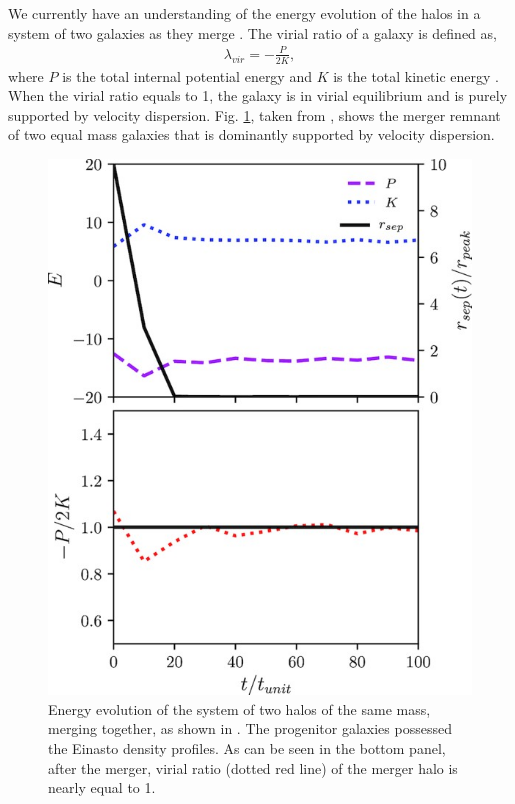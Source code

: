 \documentclass[twocolumn]{aastex631}
\begin{document}
We currently have an understanding of the energy evolution of the halos in a system of two galaxies as they merge \citep[e.g.][]{same_mass_merger_1, same_mass_merger_2}. The virial ratio of a galaxy is defined as, 
\begin{align}
    \lambda_{vir} = - \frac{P}{2K},
    \label{eq:virial_ratio}
\end{align}
where $P$ is the total internal potential energy and $K$ is the total kinetic energy \citep{same_mass_merger_1}. When the virial ratio equals to 1, the galaxy is in virial equilibrium and is purely supported by velocity dispersion. Fig. \ref{fig:virial}, taken from \cite{same_mass_merger_1}, shows the merger remnant of two equal mass galaxies that is dominantly supported by velocity dispersion.

\begin{figure}[htbp]
\includegraphics[width=.5\textwidth]{two_galaxy_merger.jpg}
\caption{Energy evolution of the system of two halos of the same mass, merging together, as shown in \cite{same_mass_merger_1}. The progenitor galaxies possessed the Einasto density profiles. As can be seen in the bottom panel, after the merger, virial ratio (dotted red line) of the merger halo is nearly equal to 1.\label{fig:virial}}
\end{figure}
\end{document}
